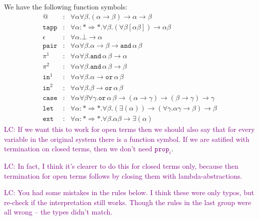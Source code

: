 \documentclass[runningheads,a4paper]{llncs}
\newcommand{\arrtype}{\rightarrow}
\newcommand{\arrkind}{\Rightarrow}
\newcommand{\LC}[1]{\textcolor{purple}{LC: #1}}
\begin{document}
We have the following function symbols:
\[
\begin{array}{rcl}
@ & : & \forall \alpha \forall \beta . (\alpha \arrtype \beta) \arrtype \alpha \arrtype \beta \\
\mathtt{tapp} & : & \forall \alpha : * \arrkind * . \forall \beta .
  (\forall \beta [\alpha \beta]) \arrtype \alpha \beta \\
\epsilon & : & \forall \alpha . \bot \arrtype \alpha \\
\mathtt{pair} & : & \forall \alpha \forall \beta . \alpha \arrtype \beta \arrtype
  \mathtt{and}\, \alpha\, \beta \\
\pi^1 & : & \forall \alpha \forall \beta . \mathtt{and}\, \alpha\, \beta \arrtype \alpha \\
\pi^2 & : & \forall \alpha \forall \beta . \mathtt{and}\, \alpha\, \beta \arrtype \beta \\
\mathtt{in}^1 & : & \forall \alpha \forall \beta . \alpha \arrtype
  \mathtt{or}\, \alpha\, \beta \\
\mathtt{in}^2 & : & \forall \alpha \forall \beta . \beta \arrtype
  \mathtt{or}\, \alpha\, \beta \\
\mathtt{case} & : & \forall \alpha \forall \beta \forall \gamma . \mathtt{or}\, \alpha\, \beta \arrtype
  (\alpha \arrtype \gamma) \arrtype (\beta \arrtype \gamma) \arrtype \gamma \\
\mathtt{let} & : & \forall \alpha : * \arrkind * . \forall \beta .
  (\exists (\alpha)) \arrtype
  (\forall \gamma . \alpha \gamma \arrtype \beta) \arrtype \beta \\
\mathtt{ext} & : & \forall \alpha : * \arrkind * . \forall \beta . \alpha \beta \arrtype
  \exists (\alpha)
\end{array}
\]
\LC{If we want this to work for open terms then we should also say
  that for every variable in the original system there is a function
  symbol. If we are satified with termination on closed terms, then we
  don't need $\mathtt{prop}_i$}.

\LC{In fact, I think it's clearer to do this for closed terms only,
  because then termination for open terms follows by closing them with
  lambda-abstractions.}

\LC{You had some mistakes in the rules below. I think these were only
  typos, but re-check if the interpretation still works. Though the
  rules in the last group were all wrong -- the types didn't match.}
\end{document}
